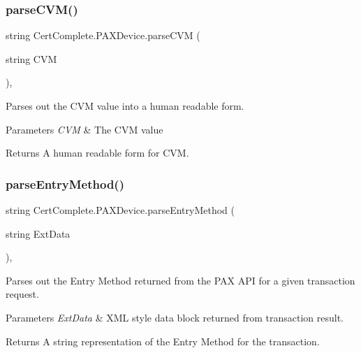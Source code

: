 \subsubsection{\texorpdfstring{parse\+C\+V\+M()}{parseCVM()}}
{\footnotesize\ttfamily string Cert\+Complete.\+P\+A\+X\+Device.\+parse\+C\+VM (\begin{DoxyParamCaption}\item[{string}]{C\+VM }\end{DoxyParamCaption})\hspace{0.3cm}{\ttfamily [inline]}, {\ttfamily [private]}}



Parses out the C\+VM value into a human readable form. 


\begin{DoxyParams}{Parameters}
{\em C\+VM} & The C\+VM value\\
\hline
\end{DoxyParams}
\begin{DoxyReturn}{Returns}
A human readable form for C\+VM.
\end{DoxyReturn}
\mbox{\label{class_cert_complete_1_1_p_a_x_device_ae4a13ce8b706ba5362cb5a32dcb53d7d}} 
\subsubsection{\texorpdfstring{parse\+Entry\+Method()}{parseEntryMethod()}}
{\footnotesize\ttfamily string Cert\+Complete.\+P\+A\+X\+Device.\+parse\+Entry\+Method (\begin{DoxyParamCaption}\item[{string}]{Ext\+Data }\end{DoxyParamCaption})\hspace{0.3cm}{\ttfamily [inline]}, {\ttfamily [private]}}



Parses out the Entry Method returned from the P\+AX A\+PI for a given transaction request. 


\begin{DoxyParams}{Parameters}
{\em Ext\+Data} & X\+ML style data block returned from transaction result.\\
\hline
\end{DoxyParams}
\begin{DoxyReturn}{Returns}
A string representation of the Entry Method for the transaction.
\end{DoxyReturn}
\mbox{\label{class_cert_complete_1_1_p_a_x_device_aa53343951e87adb1f4e505dc39f2f571}} 
